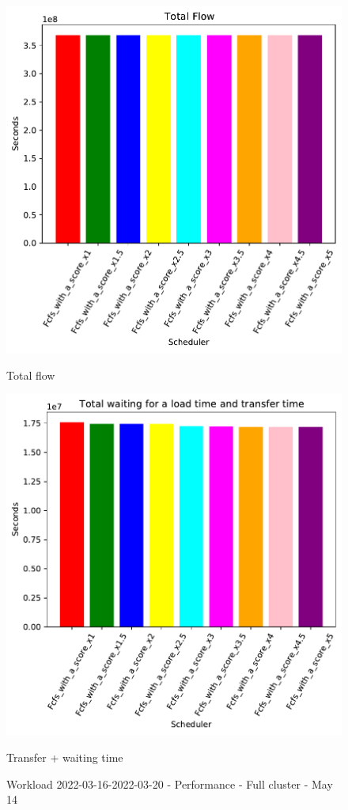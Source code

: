 \documentclass[a4paper]{article}
\begin{document}
\begin{figure}[H]
	\begin{minipage}[b]{0.5\linewidth}\centering\includegraphics[width=1\linewidth]{MBSS/plot/FCFS_Score_2022-03-16->2022-03-20_Total_flow_450_128_32_256_4_1024.pdf}\caption{Total flow}\vspace{4ex}\end{minipage}%
	\begin{minipage}[b]{0.5\linewidth}\centering\includegraphics[width=1\linewidth]{MBSS/plot/FCFS_Score_2022-03-16->2022-03-20_Total_waiting_for_a_load_time_and_transfer_time_450_128_32_256_4_1024.pdf}\caption{Transfer + waiting time}\vspace{4ex}\end{minipage}\caption{Workload 2022-03-16-2022-03-20 - Performance - Full cluster - May 14}\end{figure}
\end{document}
